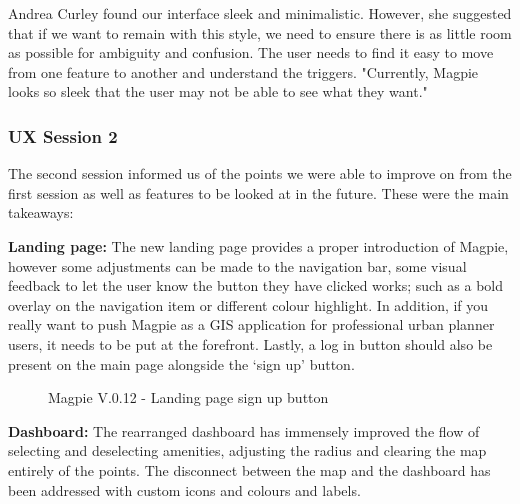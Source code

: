Andrea Curley found our interface sleek and minimalistic. However,
she suggested that if we want to remain with this style, we need to ensure there
is as little room as possible for ambiguity and confusion. The user needs to
find it easy to move from one feature to another and understand the triggers.
"Currently, Magpie looks so sleek that the user may not be able to see what they
want."

\newpage{}

\subsubsection{UX Session 2}
The second session informed us of the points we were able to improve on from the
first session as well as features to be looked at in the future. These were the
main takeaways:

\noindent\textbf{Landing page: }
The new landing page provides a proper introduction of Magpie, however some
adjustments can be made to the navigation bar, some visual feedback to let the
user know the button they have clicked works; such as a bold overlay on the
navigation item or different colour highlight. In addition, if you really want
to push Magpie as a GIS application for professional urban planner users, it
needs to be put at the forefront. Lastly, a log in button should also be present
on the main page alongside the `sign up' button.

\begin{figure}[h!]
    \centering
    \caption{Magpie V.0.12 - Landing page sign up button}
\end{figure}

\textbf{Dashboard: }
The rearranged dashboard has immensely improved the flow of selecting and
deselecting amenities, adjusting the radius and clearing the map entirely of the
points. The disconnect between the map and the dashboard has been addressed with
custom icons and colours and labels.

